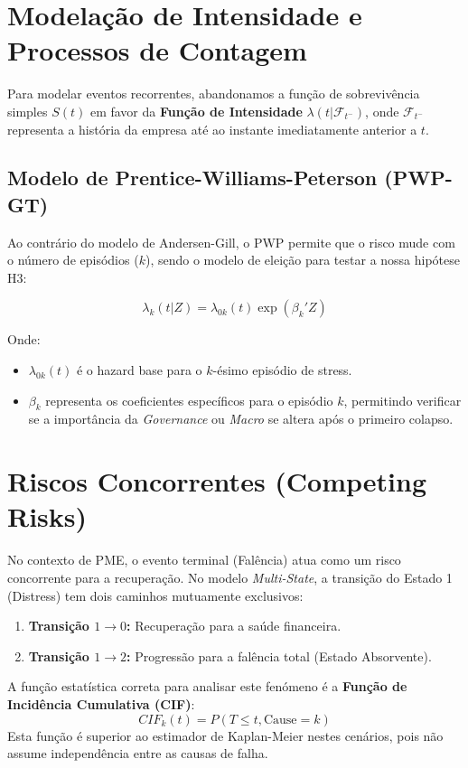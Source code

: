 \section{Modelação de Intensidade e Processos de Contagem}

Para modelar eventos recorrentes, abandonamos a função de sobrevivência simples $S(t)$ em favor da \textbf{Função de Intensidade} $\lambda(t | \mathcal{F}_{t^-})$, onde $\mathcal{F}_{t^-}$ representa a história da empresa até ao instante imediatamente anterior a $t$.

\subsection{Modelo de Prentice-Williams-Peterson (PWP-GT)}
Ao contrário do modelo de Andersen-Gill, o PWP permite que o risco mude com o número de episódios ($k$), sendo o modelo de eleição para testar a nossa hipótese H3:

\begin{equation}
    \lambda_k(t | Z) = \lambda_{0k}(t) \exp(\beta_k' Z)
\end{equation}

Onde:
\begin{itemize}
    \item $\lambda_{0k}(t)$ é o hazard base para o $k$-ésimo episódio de stress.
    \item $\beta_k$ representa os coeficientes específicos para o episódio $k$, permitindo verificar se a importância da \textit{Governance} ou \textit{Macro} se altera após o primeiro colapso.
\end{itemize}

\section{Riscos Concorrentes (Competing Risks)}

No contexto de PME, o evento terminal (Falência) atua como um risco concorrente para a recuperação. No modelo \textit{Multi-State}, a transição do Estado 1 (Distress) tem dois caminhos mutuamente exclusivos:
\begin{enumerate}
    \item \textbf{Transição $1 \to 0$:} Recuperação para a saúde financeira.
    \item \textbf{Transição $1 \to 2$:} Progressão para a falência total (Estado Absorvente).
\end{enumerate}

A função estatística correta para analisar este fenómeno é a \textbf{Função de Incidência Cumulativa (CIF)}:
\begin{equation}
    CIF_k(t) = P(T \le t, \text{Cause} = k)
\end{equation}
Esta função é superior ao estimador de Kaplan-Meier nestes cenários, pois não assume independência entre as causas de falha.

